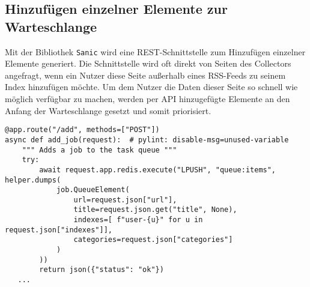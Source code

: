 \subsection{Hinzufügen einzelner Elemente zur Warteschlange}
Mit der Bibliothek \texttt{Sanic} wird eine REST-Schnittstelle zum Hinzufügen einzelner Elemente generiert.
Die Schnittstelle wird oft direkt von Seiten des Collectors angefragt, wenn ein Nutzer diese Seite außerhalb eines RSS-Feeds zu seinem Index hinzufügen möchte.
Um dem Nutzer die Daten dieser Seite so schnell wie möglich verfügbar zu machen, werden per API hinzugefügte Elemente an den Anfang der Warteschlange gesetzt und somit priorisiert.
\begin{verbatim}
@app.route("/add", methods=["POST"])
async def add_job(request):  # pylint: disable-msg=unused-variable
    """ Adds a job to the task queue """
    try:
        await request.app.redis.execute("LPUSH", "queue:items", helper.dumps(
            job.QueueElement(
                url=request.json["url"],
                title=request.json.get("title", None),
                indexes=[ f"user-{u}" for u in request.json["indexes"]],
                categories=request.json["categories"]
            )
        ))
        return json({"status": "ok"})
   ...
\end{verbatim}
